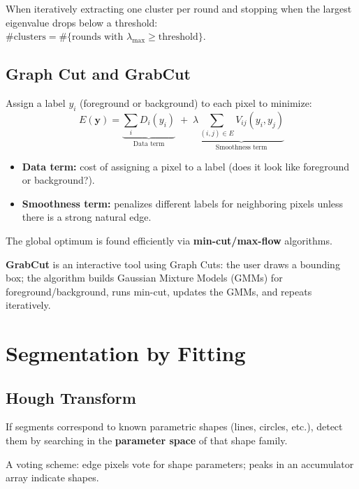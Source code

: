 \documentclass[11pt, oneside]{book}
\newcommand{\vct}[1]{\bm{#1}}           %
\begin{document}
When iteratively extracting one cluster per round and stopping when the largest eigenvalue drops below a threshold:
$\#\text{clusters} = \#\{\text{rounds with } \lambda_{\max} \ge \text{threshold}\}$.

\subsection{Graph Cut and GrabCut}

\begin{thmbox}[title={Graph Cut Energy Minimization}]
Assign a label $y_i$ (foreground or background) to each pixel to minimize:
\[
E(\vct{y}) = \underbrace{\sum_i D_i(y_i)}_{\text{Data term}} \;+\; \lambda \underbrace{\sum_{(i,j)\in E} V_{ij}(y_i,y_j)}_{\text{Smoothness term}}
\]
\begin{itemize}
  \item \textbf{Data term:} cost of assigning a pixel to a label (does it look like foreground or background?).
  \item \textbf{Smoothness term:} penalizes different labels for neighboring pixels unless there is a strong natural edge.
\end{itemize}
The global optimum is found efficiently via \textbf{min-cut/max-flow} algorithms.
\end{thmbox}

\textbf{GrabCut} is an interactive tool using Graph Cuts: the user draws a bounding box; the algorithm builds
Gaussian Mixture Models (GMMs) for foreground/background, runs min-cut, updates the GMMs, and repeats iteratively.

\section{Segmentation by Fitting}

\subsection{Hough Transform}

If segments correspond to known parametric shapes (lines, circles, etc.), detect them by searching in the
\textbf{parameter space} of that shape family.

\begin{defbox}[title={Hough Transform}]
A voting scheme: edge pixels vote for shape parameters; peaks in an accumulator array indicate shapes.
\end{defbox}
\end{document}
